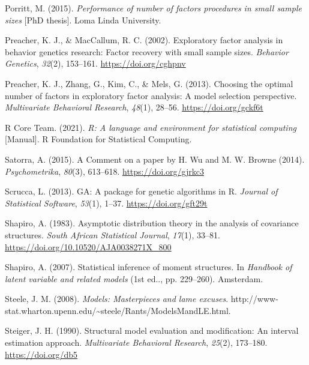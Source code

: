 \documentclass[11pt]{umnthesis}
\newlength{\cslhangindent}
\newenvironment{CSLReferences}[2] %
 {%
  \setlength{\parindent}{0pt}
  \ifodd #1 \everypar{\setlength{\hangindent}{\cslhangindent}}\ignorespaces\fi
  \ifnum #2 > 0
  \setlength{\parskip}{#2\baselineskip}
  \fi
 }%
 {}
\begin{document}
\begin{CSLReferences}{1}{0}
\leavevmode{}%
Porritt, M. (2015). \emph{Performance of number of factors procedures in small sample sizes} {[}PhD thesis{]}. Loma Linda University.

\leavevmode{}%
Preacher, K. J., \& MacCallum, R. C. (2002). Exploratory factor analysis in behavior genetics research: {Factor} recovery with small sample sizes. \emph{Behavior Genetics}, \emph{32}(2), 153--161. \url{https://doi.org/cghpnv}

\leavevmode{}%
Preacher, K. J., Zhang, G., Kim, C., \& Mels, G. (2013). Choosing the optimal number of factors in exploratory factor analysis: {A} model selection perspective. \emph{Multivariate Behavioral Research}, \emph{48}(1), 28--56. \url{https://doi.org/gckf6t}

\leavevmode{}%
R Core Team. (2021). \emph{R: {A} language and environment for statistical computing} {[}Manual{]}. {R Foundation for Statistical Computing}.

\leavevmode{}%
Satorra, A. (2015). A {Comment} on a paper by {H}. {Wu} and {M}. {W}. {Browne} (2014). \emph{Psychometrika}, \emph{80}(3), 613--618. \url{https://doi.org/gjrkc3}

\leavevmode{}%
Scrucca, L. (2013). {GA}: {A} package for genetic algorithms in {R}. \emph{Journal of Statistical Software}, \emph{53}(1), 1--37. \url{https://doi.org/gft29t}

\leavevmode{}%
Shapiro, A. (1983). Asymptotic distribution theory in the analysis of covariance structures. \emph{South African Statistical Journal}, \emph{17}(1), 33--81. \url{https://doi.org/10.10520/AJA0038271X_800}

\leavevmode{}%
Shapiro, A. (2007). Statistical inference of moment structures. In \emph{Handbook of latent variable and related models} (1st ed.., pp. 229--260). {Amsterdam}.

\leavevmode{}%
Steele, J. M. (2008). \emph{Models: {Masterpieces} and lame excuses}. http://www-stat.wharton.upenn.edu/\textasciitilde steele/Rants/ModelsMandLE.html.

\leavevmode{}%
Steiger, J. H. (1990). Structural model evaluation and modification: {An} interval estimation approach. \emph{Multivariate Behavioral Research}, \emph{25}(2), 173--180. \url{https://doi.org/db5}


\end{CSLReferences}
\end{document}
